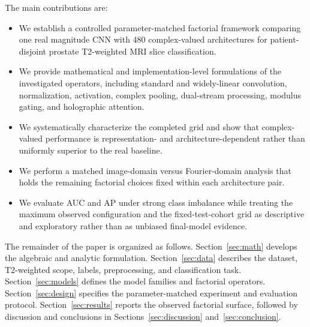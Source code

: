 The main contributions are:
\begin{itemize}
    \item We establish a controlled parameter-matched factorial framework comparing one real magnitude CNN with 480 complex-valued architectures for patient-disjoint prostate T2-weighted MRI slice classification.
    \item We provide mathematical and implementation-level formulations of the investigated operators, including standard and widely-linear convolution, normalization, activation, complex pooling, dual-stream processing, modulus gating, and holographic attention.
    \item We systematically characterize the completed grid and show that complex-valued performance is representation- and architecture-dependent rather than uniformly superior to the real baseline.
    \item We perform a matched image-domain versus Fourier-domain analysis that holds the remaining factorial choices fixed within each architecture pair.
    \item We evaluate AUC and AP under strong class imbalance while treating the maximum observed configuration and the fixed-test-cohort grid as descriptive and exploratory rather than as unbiased final-model evidence.
\end{itemize}

The remainder of the paper is organized as follows. Section~\ref{sec:math} develops the algebraic and analytic formulation. Section~\ref{sec:data} describes the dataset, T2-weighted scope, labels, preprocessing, and classification task. Section~\ref{sec:models} defines the model families and factorial operators. Section~\ref{sec:design} specifies the parameter-matched experiment and evaluation protocol. Section~\ref{sec:results} reports the observed factorial surface, followed by discussion and conclusions in Sections~\ref{sec:discussion} and~\ref{sec:conclusion}.
